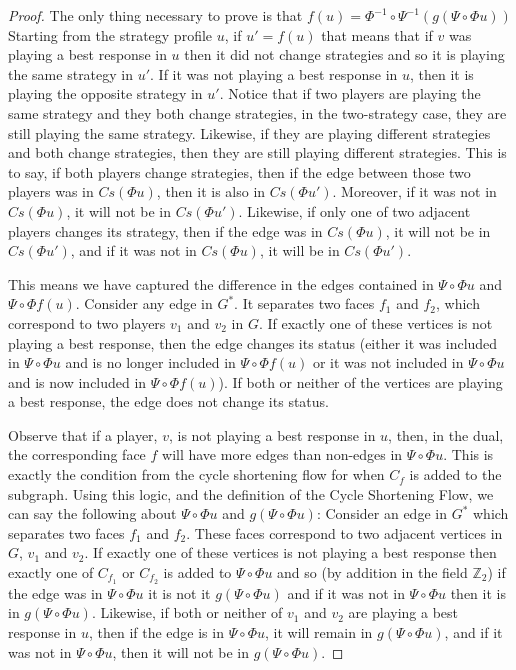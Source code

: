 \documentclass{article}
\begin{document}
\begin{proof}
    The only thing necessary to prove is that $f(u)=\Phi^{-1}\circ\Psi^{-1}(g(\Psi\circ\Phi u))$ Starting from the strategy profile $u$, if $u'=f(u)$ that means that if $v$ was playing a best response in $u$ then it did not change strategies and so it is playing the same strategy in $u'$. If it was not playing a best response in $u$, then it is playing the opposite strategy in $u'$. Notice that if two players are playing the same strategy and they both change strategies, in the two-strategy case, they are still playing the same strategy. Likewise, if they are playing different strategies and both change strategies, then they are still playing different strategies. This is to say, if both players change strategies, then if the edge between those two players was in $Cs(\Phi u)$, then it is also in $Cs(\Phi u')$. Moreover, if it was not in $Cs(\Phi u)$, it will not be in $Cs(\Phi u')$. Likewise, if only one of two adjacent players changes its strategy, then if the edge was in $Cs(\Phi u)$, it will not be in $Cs(\Phi u')$, and if it was not in $Cs(\Phi u)$, it will be in $Cs(\Phi u')$.

    This means we have captured the difference in the edges contained in $\Psi\circ \Phi u$ and $\Psi \circ\Phi f(u)$. Consider any edge in $G^*$. It separates two faces $f_1$ and $f_2$, which correspond to two players $v_1$ and $v_2$ in $G$. If exactly one of these vertices is not playing a best response, then the edge changes its status (either it was included in $\Psi \circ \Phi u$ and is no longer included in $\Psi \circ\Phi f(u)$ or it was not included in $\Psi \circ \Phi u$ and is now included in $\Psi \circ \Phi f(u)$). If both or neither of the vertices are playing a best response, the edge does not change its status.

    Observe that if a player, $v$, is not playing a best response in $u$, then, in the dual, the corresponding face $f$ will have more edges than non-edges in $\Psi\circ\Phi u$. This is exactly the condition from the cycle shortening flow for when $C_f$ is added to the subgraph. Using this logic, and the definition of the Cycle Shortening Flow, we can say the following about $\Psi\circ \Phi u$ and $g(\Psi\circ\Phi u)$: Consider an edge in $G^*$ which separates two faces $f_1$ and $f_2$. These faces correspond to two adjacent vertices in $G$, $v_1$ and $v_2$. If exactly one of these vertices is not playing a best response then exactly one of $C_{f_1}$ or $C_{f_2}$ is added to $\Psi\circ\Phi u$ and so (by addition in the field $\mathbb{Z}_2$) if the edge was in $\Psi\circ\Phi u$ it is not it $g(\Psi \circ\Phi u)$ and if it was not in $\Psi\circ\Phi u$ then it is in $g(\Psi\circ\Phi u)$. Likewise, if both or neither of $v_1$ and $v_2$ are playing a best response in $u$, then if the edge is in $\Psi\circ\Phi u$, it will remain in $g(\Psi\circ\Phi u)$, and if it was not in $\Psi\circ\Phi u$, then it will not be in $g(\Psi\circ\Phi u)$.


\end{proof}
\end{document}

